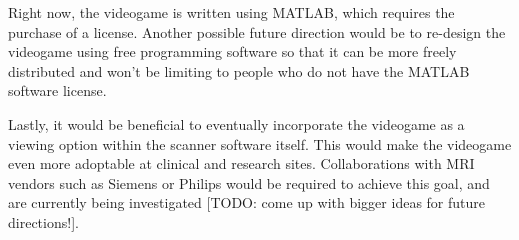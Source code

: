 	Right now, the videogame is written using MATLAB, which requires the purchase of a license. Another possible future direction would be to re-design the videogame using free programming software so that it can be more freely distributed and won't be limiting to people who do not have the MATLAB software license. 
	
	Lastly, it would be beneficial to eventually incorporate the videogame as a viewing option within the scanner software itself. This would make the videogame even more adoptable at clinical and research sites. Collaborations with MRI vendors such as Siemens or Philips would be required to achieve this goal, and are currently being investigated [TODO: come up with bigger ideas for future directions!].
	
	